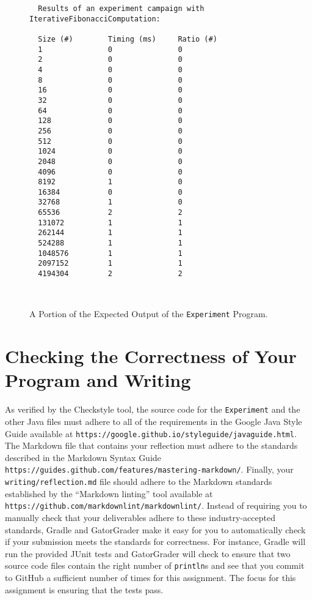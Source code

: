 \documentclass[11pt]{article}
\newcommand{\mainprogram}{\lstinline{Experiment}}
\newcommand{\reflection}{\lstinline{writing/reflection.md}}
\newcommand{\program}[1]{\lstinline{#1}}
\newcommand{\url}[1]{\lstinline{#1}}
\newcommand{\step}[1]{``{#1}''}
\begin{document}
\begin{figure}[t]
  \centering
  \begin{verbatim}
  Results of an experiment campaign with IterativeFibonacciComputation:

  Size (#)        Timing (ms)     Ratio (#)
  1               0               0
  2               0               0
  4               0               0
  8               0               0
  16              0               0
  32              0               0
  64              0               0
  128             0               0
  256             0               0
  512             0               0
  1024            0               0
  2048            0               0
  4096            0               0
  8192            1               0
  16384           0               0
  32768           1               0
  65536           2               2
  131072          1               1
  262144          1               1
  524288          1               1
  1048576         1               1
  2097152         1               1
  4194304         2               2
  \end{verbatim}
  \vspace*{-.35in}
  \caption{A Portion of the Expected Output of the \mainprogram{} Program.}~\label{fig:output}
  \vspace*{-.25in}
\end{figure}

\section*{Checking the Correctness of Your Program and Writing}

As verified by the Checkstyle tool, the source code for the \mainprogram{} and
the other Java files must adhere to all of the requirements in the Google Java
Style Guide available at
\url{https://google.github.io/styleguide/javaguide.html}. The Markdown file that
contains your reflection must adhere to the standards described in the Markdown
Syntax Guide \url{https://guides.github.com/features/mastering-markdown/}.
Finally, your \reflection{} file should adhere to the Markdown standards
established by the \step{Markdown linting} tool available at
\url{https://github.com/markdownlint/markdownlint/}. Instead of requiring you to
manually check that your deliverables adhere to these industry-accepted
standards, Gradle and GatorGrader make it easy for you to automatically check if
your submission meets the standards for correctness. For instance, Gradle will
run the provided JUnit tests and GatorGrader will check to ensure that two
source code files contain the right number of \program{println}s and see that
you commit to GitHub a sufficient number of times for this assignment. The focus
for this assignment is ensuring that the tests pass.
\end{document}
